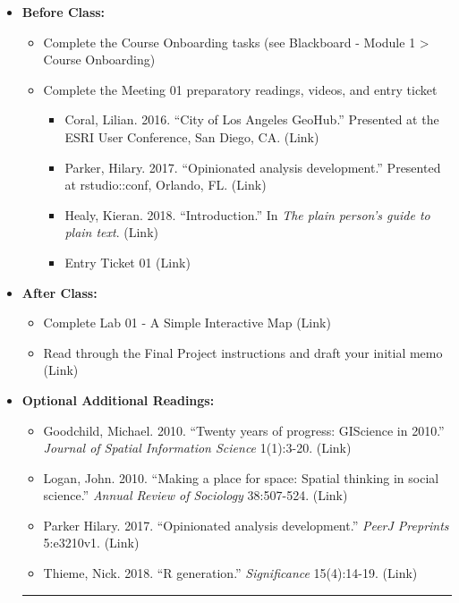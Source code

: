 \documentclass[
]{book}
\providecommand{\tightlist}{%
  \setlength{\itemsep}{0pt}\setlength{\parskip}{0pt}}
\begin{document}
\begin{itemize}
\tightlist
\item
  \textbf{Before Class:}

  \begin{itemize}
  \tightlist
  \item
    Complete the Course Onboarding tasks (see Blackboard - Module 1 \textgreater{} Course Onboarding)
  \item
    Complete the Meeting 01 preparatory readings, videos, and entry ticket

    \begin{itemize}
    \tightlist
    \item
      Coral, Lilian. 2016. ``City of Los Angeles GeoHub.'' Presented at the ESRI User Conference, San Diego, CA. (Link)
    \item
      Parker, Hilary. 2017. ``Opinionated analysis development.'' Presented at rstudio::conf, Orlando, FL. (Link)
    \item
      Healy, Kieran. 2018. ``Introduction.'' In \emph{The plain person's guide to plain text}. (Link)
    \item
      Entry Ticket 01 (Link)
    \end{itemize}
  \end{itemize}
\item
  \textbf{After Class:}

  \begin{itemize}
  \tightlist
  \item
    Complete Lab 01 - A Simple Interactive Map (Link)
  \item
    Read through the Final Project instructions and draft your initial memo (Link)
  \end{itemize}
\item
  \textbf{Optional Additional Readings:}

  \begin{itemize}
  \tightlist
  \item
    Goodchild, Michael. 2010. ``Twenty years of progress: GIScience in 2010.'' \emph{Journal of Spatial Information Science} 1(1):3-20. (Link)
  \item
    Logan, John. 2010. ``Making a place for space: Spatial thinking in social science.'' \emph{Annual Review of Sociology} 38:507-524. (Link)
  \item
    Parker Hilary. 2017. ``Opinionated analysis development.'' \emph{PeerJ Preprints} 5:e3210v1. (Link)
  \item
    Thieme, Nick. 2018. ``R generation.'' \emph{Significance} 15(4):14-19. (Link)
  \end{itemize}

  \begin{center}\rule{0.5\linewidth}{0.5pt}\end{center}
\end{itemize}

  
\end{document}
